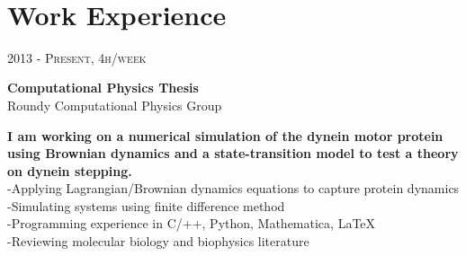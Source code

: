 \documentclass[10pt]{article} %
\begin{document}
\color{text1} %


\par{\\%
  \vspace{10pt} %
	

\begin{minipage}[t]{0.5\textwidth} %
\vspace{0pt} %
	

\section{Work Experience} 


{\raggedleft\textsc{2013 - Present, 4h/week}\par}

{\raggedright\large \textbf{Computational Physics Thesis}\\
{Roundy Computational Physics Group}\\[5pt]}
\normalsize{\textbf{I am working on a numerical simulation of the dynein motor protein using Brownian dynamics and a state-transition model to test a theory on dynein stepping.}}\\
\hspace*{0.2in}-Applying Lagrangian/Brownian dynamics equations to capture protein dynamics\\
\hspace*{0.2in}-Simulating systems using finite difference method\\
\hspace*{0.2in}-Programming experience in C/++, Python, Mathematica, LaTeX\\
\hspace*{0.2in}-Reviewing molecular biology and biophysics literature\\


\end{minipage}}
\end{document}
